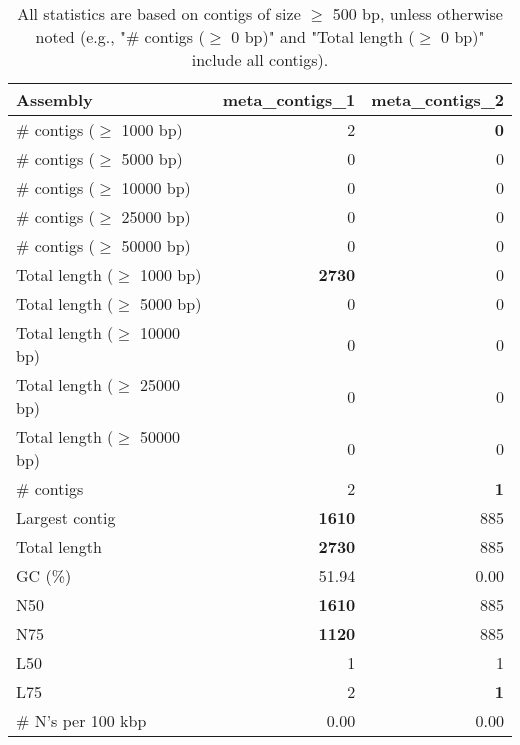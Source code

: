 \documentclass[12pt,a4paper]{article}
\begin{document}
\begin{table}[ht]
\begin{center}
\caption{All statistics are based on contigs of size $\geq$ 500 bp, unless otherwise noted (e.g., "\# contigs ($\geq$ 0 bp)" and "Total length ($\geq$ 0 bp)" include all contigs).}
\begin{tabular}{|l*{2}{|r}|}
\hline
Assembly & meta\_contigs\_1 & meta\_contigs\_2 \\ \hline
\# contigs ($\geq$ 1000 bp) & 2 & {\bf 0} \\ \hline
\# contigs ($\geq$ 5000 bp) & 0 & 0 \\ \hline
\# contigs ($\geq$ 10000 bp) & 0 & 0 \\ \hline
\# contigs ($\geq$ 25000 bp) & 0 & 0 \\ \hline
\# contigs ($\geq$ 50000 bp) & 0 & 0 \\ \hline
Total length ($\geq$ 1000 bp) & {\bf 2730} & 0 \\ \hline
Total length ($\geq$ 5000 bp) & 0 & 0 \\ \hline
Total length ($\geq$ 10000 bp) & 0 & 0 \\ \hline
Total length ($\geq$ 25000 bp) & 0 & 0 \\ \hline
Total length ($\geq$ 50000 bp) & 0 & 0 \\ \hline
\# contigs & 2 & {\bf 1} \\ \hline
Largest contig & {\bf 1610} & 885 \\ \hline
Total length & {\bf 2730} & 885 \\ \hline
GC (\%) & 51.94 & 0.00 \\ \hline
N50 & {\bf 1610} & 885 \\ \hline
N75 & {\bf 1120} & 885 \\ \hline
L50 & 1 & 1 \\ \hline
L75 & 2 & {\bf 1} \\ \hline
\# N's per 100 kbp & 0.00 & 0.00 \\ \hline
\end{tabular}
\end{center}
\end{table}
\end{document}
